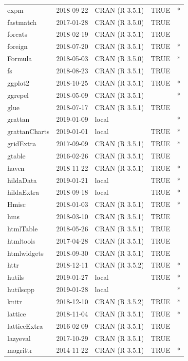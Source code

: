 \documentclass{grattan}\usepackage[]{graphicx}\usepackage[]{color}
\begin{document}
\begin{longtable}{lllll}
  expm & 2018-09-22 & CRAN (R 3.5.1) & TRUE & * \\ 
  fastmatch & 2017-01-28 & CRAN (R 3.5.0) & TRUE &  \\ 
  forcats & 2018-02-19 & CRAN (R 3.5.1) & TRUE &  \\ 
  foreign & 2018-07-20 & CRAN (R 3.5.1) & TRUE & * \\ 
  Formula & 2018-05-03 & CRAN (R 3.5.0) & TRUE & * \\ 
  fs & 2018-08-23 & CRAN (R 3.5.1) & TRUE &  \\ 
  ggplot2 & 2018-10-25 & CRAN (R 3.5.1) & TRUE & * \\ 
  ggrepel & 2018-05-09 & CRAN (R 3.5.1) &  & * \\ 
  glue & 2018-07-17 & CRAN (R 3.5.1) & TRUE &  \\ 
  grattan & 2019-01-09 & local &  & * \\ 
  grattanCharts & 2019-01-01 & local & TRUE & * \\ 
  gridExtra & 2017-09-09 & CRAN (R 3.5.1) & TRUE & * \\ 
  gtable & 2016-02-26 & CRAN (R 3.5.1) & TRUE &  \\ 
  haven & 2018-11-22 & CRAN (R 3.5.1) & TRUE & * \\ 
  hildaData & 2019-01-21 & local & TRUE & * \\ 
  hildaExtra & 2018-09-18 & local & TRUE & * \\ 
  Hmisc & 2018-01-03 & CRAN (R 3.5.1) & TRUE & * \\ 
  hms & 2018-03-10 & CRAN (R 3.5.1) & TRUE &  \\ 
  htmlTable & 2018-05-26 & CRAN (R 3.5.1) & TRUE &  \\ 
  htmltools & 2017-04-28 & CRAN (R 3.5.1) & TRUE &  \\ 
  htmlwidgets & 2018-09-30 & CRAN (R 3.5.1) & TRUE &  \\ 
  httr & 2018-12-11 & CRAN (R 3.5.2) & TRUE & * \\ 
  hutils & 2019-01-27 & local & TRUE & * \\ 
  hutilscpp & 2019-01-28 & local &  & * \\ 
  knitr & 2018-12-10 & CRAN (R 3.5.2) & TRUE & * \\ 
  lattice & 2018-11-04 & CRAN (R 3.5.1) & TRUE & * \\ 
  latticeExtra & 2016-02-09 & CRAN (R 3.5.1) & TRUE &  \\ 
  lazyeval & 2017-10-29 & CRAN (R 3.5.1) & TRUE &  \\ 
  magrittr & 2014-11-22 & CRAN (R 3.5.1) & TRUE & * \\ 

\end{longtable}
\end{document}
